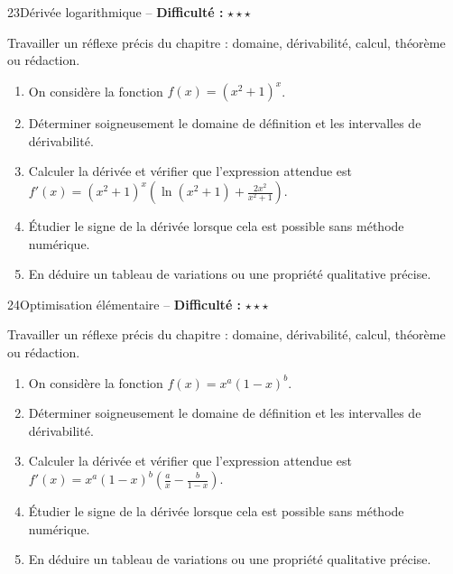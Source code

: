 \documentclass[11pt,a4paper]{article}
\newcommand{\etoiles}[1]{\textbf{Difficulté :} #1}
\begin{document}
\begin{exobox}{23}{Dérivée logarithmique -- \etoiles{$\star\star\star$}}

\begin{objectifbox}
Travailler un réflexe précis du chapitre : domaine, dérivabilité, calcul, théorème ou rédaction.
\end{objectifbox}

\begin{enumerate}

\item On considère la fonction $f(x)=(x^2+1)^x$.

\item Déterminer soigneusement le domaine de définition et les intervalles de dérivabilité.

\item Calculer la dérivée et vérifier que l'expression attendue est $f'(x)=(x^2+1)^x\left(\ln(x^2+1)+\frac{2x^2}{x^2+1}\right)$.

\item Étudier le signe de la dérivée lorsque cela est possible sans méthode numérique.

\item En déduire un tableau de variations ou une propriété qualitative précise.

\end{enumerate}

\end{exobox}


\begin{exobox}{24}{Optimisation élémentaire -- \etoiles{$\star\star\star$}}

\begin{objectifbox}
Travailler un réflexe précis du chapitre : domaine, dérivabilité, calcul, théorème ou rédaction.
\end{objectifbox}

\begin{enumerate}

\item On considère la fonction $f(x)=x^a(1-x)^b$.

\item Déterminer soigneusement le domaine de définition et les intervalles de dérivabilité.

\item Calculer la dérivée et vérifier que l'expression attendue est $f'(x)=x^a(1-x)^b\left(\frac{a}{x}-\frac{b}{1-x}\right)$.

\item Étudier le signe de la dérivée lorsque cela est possible sans méthode numérique.

\item En déduire un tableau de variations ou une propriété qualitative précise.

\end{enumerate}

\end{exobox}
\end{document}
